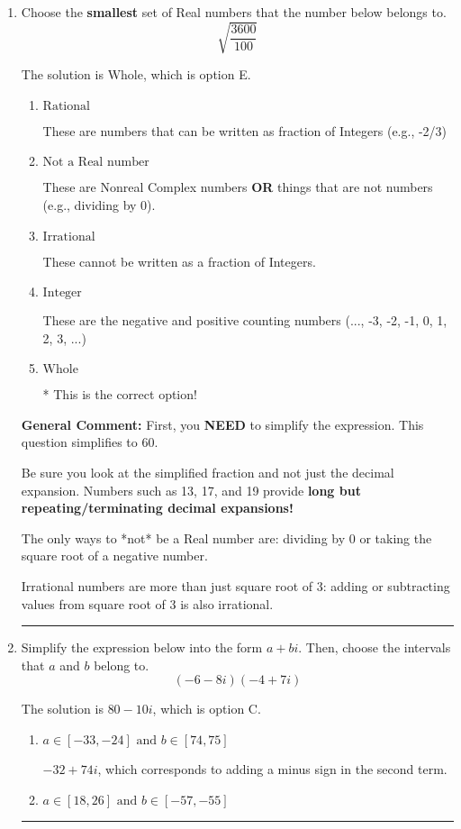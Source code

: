\documentclass{extbook}[14pt]
\newcommand{\litem}[1]{\item #1

\rule{\textwidth}{0.4pt}}
\begin{document}
\begin{enumerate}\litem{
Choose the \textbf{smallest} set of Real numbers that the number below belongs to.
\[ \sqrt{\frac{3600}{100}} \]

The solution is \( \text{Whole} \), which is option E.\begin{enumerate}[label=\Alph*.]
\item \( \text{Rational} \)

These are numbers that can be written as fraction of Integers (e.g., -2/3)
\item \( \text{Not a Real number} \)

These are Nonreal Complex numbers \textbf{OR} things that are not numbers (e.g., dividing by 0).
\item \( \text{Irrational} \)

These cannot be written as a fraction of Integers.
\item \( \text{Integer} \)

These are the negative and positive counting numbers (..., -3, -2, -1, 0, 1, 2, 3, ...)
\item \( \text{Whole} \)

* This is the correct option!
\end{enumerate}

\textbf{General Comment:} First, you \textbf{NEED} to simplify the expression. This question simplifies to $60$. 
 
 Be sure you look at the simplified fraction and not just the decimal expansion. Numbers such as 13, 17, and 19 provide \textbf{long but repeating/terminating decimal expansions!} 
 
 The only ways to *not* be a Real number are: dividing by 0 or taking the square root of a negative number. 
 
 Irrational numbers are more than just square root of 3: adding or subtracting values from square root of 3 is also irrational.
}
\litem{
Simplify the expression below into the form $a+bi$. Then, choose the intervals that $a$ and $b$ belong to.
\[ (-6 - 8 i)(-4 + 7 i) \]

The solution is \( 80 - 10 i \), which is option C.\begin{enumerate}[label=\Alph*.]
\item \( a \in [-33, -24] \text{ and } b \in [74, 75] \)

 $-32 + 74 i$, which corresponds to adding a minus sign in the second term.
\item \( a \in [18, 26] \text{ and } b \in [-57, -55] \)


\end{enumerate}}
\end{enumerate}
\end{document}
